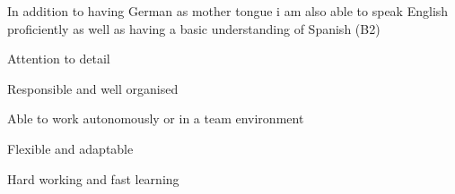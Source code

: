
\begin{cvparagraph}
In addition to having German as mother tongue i am also able to speak English proficiently as well
  as having a basic understanding of Spanish (B2)
\end{cvparagraph}

\newline

\begin{cvparagraph}

\begin{cvitems}
  \item Attention to detail
  \item Responsible and well organised
  \item Able to work autonomously or in a team environment
  \item Flexible and adaptable
  \item Hard working and fast learning
\end{cvitems}
\end{cvparagraph}



